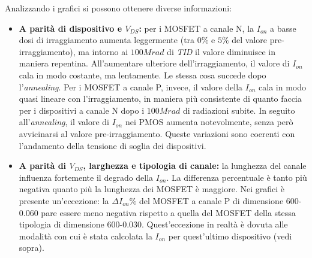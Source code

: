 Analizzando i grafici si possono ottenere diverse informazioni:
\begin{itemize}
    \item \textbf{A parità di dispositivo e $V_{DS}$:} per i MOSFET a canale N, la $I_{on}$ a basse dosi di irraggiamento aumenta leggermente (tra $0\%$ e $5\%$ del valore pre-irraggiamento), ma intorno ai $100 Mrad$ di \emph{TID} il valore diminuisce in maniera repentina. All'aumentare ulteriore dell'irraggiamento, il valore di $I_{on}$ cala in modo costante, ma lentamente. Le stessa cosa succede dopo l'\emph{annealing}. Per i MOSFET a canale P, invece, il valore della $I_{on}$ cala in modo quasi lineare con l'irraggiamento, in maniera più consistente di quanto faccia per i dispositivi a canale N dopo i $100 Mrad$ di radiazioni subite. In seguito all'\emph{annealing}, il valore di $I_{on}$ nei PMOS aumenta notevolmente, senza però avvicinarsi al valore pre-irraggiamento. Queste variazioni sono coerenti con l'andamento della tensione di soglia dei dispositivi.
	
	
    \item \textbf{A parità di $V_{DS}$, larghezza e tipologia di canale:} la lunghezza del canale influenza fortemente il degrado della $I_{on}$. La differenza percentuale è tanto più negativa quanto più la lunghezza dei MOSFET è maggiore. Nei grafici è presente un'eccezione: la $\Delta I_{on}\%$ del MOSFET a canale P di dimensione 600-0.060 pare essere meno negativa rispetto a quella del MOSFET della stessa tipologia di dimensione 600-0.030. Quest'eccezione in realtà è dovuta alle modalità con cui è stata calcolata la $I_{on}$ per quest'ultimo dispositivo (vedi sopra).

\end{itemize}
\FloatBarrier


